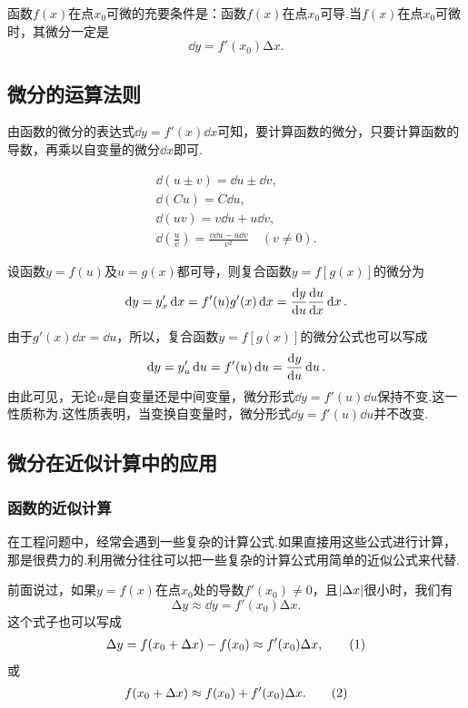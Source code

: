 \begin{theorem}
函数\(f(x)\)在点\(x_0\)可微的充要条件是：函数\(f(x)\)在点\(x_0\)可导.当\(f(x)\)在点\(x_0\)可微时，其微分一定是\[
\dd{y}=f'(x_0)\increment x.
\]
\end{theorem}

\subsection{微分的运算法则}
由函数的微分的表达式\(\dd{y} = f'(x) \dd{x}\)可知，要计算函数的微分，只要计算函数的导数，再乘以自变量的微分\(\dd{x}\)即可.

\begin{theorem}
\begin{gather}
	\dd(u \pm v) = \dd{u}\pm\dd{v}, \\
	\dd(C u) = C \dd{u}, \\
	\dd(u v) = v \dd{u} + u \dd{v}, \\
	\dd(\frac{u}{v}) = \frac{v \dd{u} - u \dd{v}}{v^2} \quad (v \neq 0).
\end{gather}
\end{theorem}

\begin{theorem}[复合函数的微分法则]
设函数\(y=f(u)\)及\(u=g(x)\)都可导，则复合函数\(y=f[g(x)]\)的微分为\[
\dd{y}=y'_x\dd{x}=f'(u)g'(x)\dd{x}=\dv{y}{u}\dv{u}{x}\dd{x}.
\]

由于\(g'(x)\dd{x}=\dd{u}\)，所以，复合函数\(y=f[g(x)]\)的微分公式也可以写成\[
\dd{y}=y'_u\dd{u}=f'(u)\dd{u}=\dv{y}{u}\dd{u}.
\]由此可见，无论\(u\)是自变量还是中间变量，微分形式\(\dd{y}=f'(u)\dd{u}\)保持不变.这一性质称为.这性质表明，当变换自变量时，微分形式\(\dd{y}=f'(u)\dd{u}\)并不改变.
\end{theorem}

\subsection{微分在近似计算中的应用}
\subsubsection{函数的近似计算}
在工程问题中，经常会遇到一些复杂的计算公式.如果直接用这些公式进行计算，那是很费力的.利用微分往往可以把一些复杂的计算公式用简单的近似公式来代替.

前面说过，如果\(y=f(x)\)在点\(x_0\)处的导数\(f'(x_0)\neq0\)，且\(\abs{\Delta x}\)很小时，我们有\[
\increment y \approx\dd{y} = f'(x_0) \increment x.
\]这个式子也可以写成\begin{gather}
\increment y = f(x_0 + \increment x) - f(x_0) \approx f'(x_0) \increment x, \tag1
\end{gather}或\begin{gather}
f(x_0 + \increment x) \approx f(x_0) + f'(x_0) \increment x. \tag2
\end{gather}

